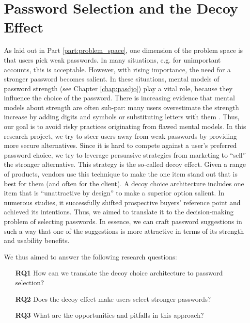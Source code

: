 \chapter[Password Selection and the Decoy Effect]{Password Selection and the Decoy Effect}\label{chap:decoy}
As laid out in Part \ref{part:problem_space}, one dimension of the problem space is that users pick weak passwords. In many situations, e.g. for unimportant accounts, this is acceptable. However, with rising importance, the need for a stronger password becomes salient. In these situations, mental models of password strength (see Chapter \ref{chap:pasdjo}) play a vital role, because they influence the choice of the password. There is increasing evidence that mental models about strength are often sub-par: many users overestimate the strength increase by adding digits and symbols or substituting letters with them \cite{Seitz2017PASDJO, Ur2016PerceptionsPassword, Ur2015PWCreationLab}. Thus, our goal is to avoid risky practices originating from flawed mental models. In this research project, we try to steer users away from weak passwords by providing more secure alternatives. Since it is hard to compete against a user's preferred password choice, we try to leverage persuasive strategies from marketing to ``sell'' the stronger alternative. This strategy is the so-called decoy effect. Given a range of products, vendors use this technique to make the one item stand out that is best for them (and often for the client). A decoy choice architecture includes one item that is ``unattractive by design'' to make a superior option salient. In numerous studies, it successfully shifted prospective buyers' reference point and achieved its intentions. Thus, we aimed to translate it to the decision-making problem of selecting passwords. In essence, we can craft password suggestions in such a way that one of the suggestions is more attractive in terms of its strength and usability benefits. 

We thus aimed to answer the following research questions:

\begin{itemize}
	\item[\textbf{RQ1}] How can we translate the decoy choice architecture to password selection?	
	\item[\textbf{RQ2}] Does the decoy effect make users select stronger passwords?
	\item[\textbf{RQ3}] What are the opportunities and pitfalls in this approach?
\end{itemize}
	
